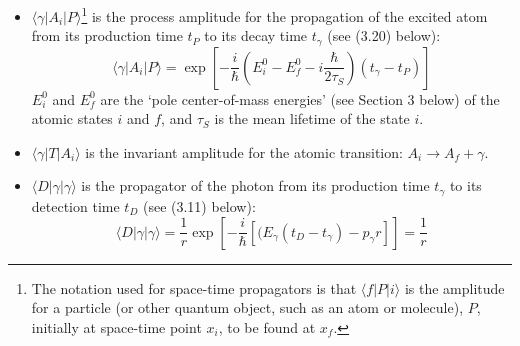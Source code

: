 {\begin{itemize}
    \item $\langle\gamma|A_i|P\rangle$\footnote{The notation used for space-time propagators
    is that $\langle f |P|i\rangle$ is the amplitude for a particle (or other quantum object, such as an atom or
   molecule), $P$, initially at space-time point $x_i$, to be found at $x_f$.} is the process amplitude for
     the propagation of the excited atom from its production time $t_P$ to its decay time
    $t_{\gamma}$ (see (3.20) below):
  \begin{equation}
   \langle\gamma|A_i|P\rangle = \exp\left[-\frac{i}{\hbar}
    (E_i^0-E_f^0-i\frac{\hbar}{2 \tau_S})(t_{\gamma}-t_P)\right]
   \end{equation}
    $E_i^0$ and $E_f^0$ are the `pole center-of-mass energies' (see Section 3 below) of the atomic states
    $i$ and $f$, and $\tau_S$ is the mean lifetime of the state $i$.
    \item $\langle\gamma|T|A_i\rangle$ is the invariant amplitude for the atomic transition:
    $A_i \rightarrow A_f + \gamma$. 
     \item  $\langle D|\gamma|\gamma\rangle$  is the propagator of the photon from its 
    production time $t_{\gamma}$ to its detection time $t_D$ (see (3.11) below):
    \begin{equation}
    \langle D|\gamma|\gamma\rangle = \frac{1}{r}\exp\left[-\frac{i}{\hbar}
     [(E_{\gamma}(t_D-t_{\gamma})-p_\gamma r]\right] =  \frac{1}{r}
   \end{equation}


\end{itemize}}
